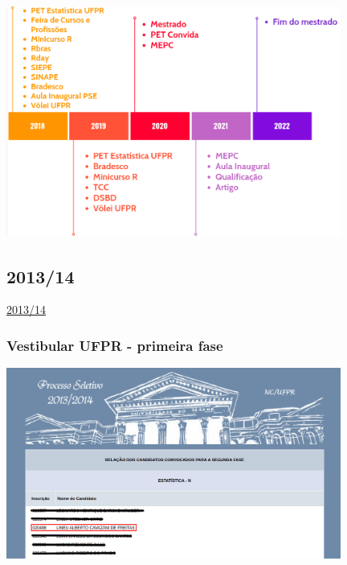 \documentclass[10pt,
  aspectratio=169,
  serif,
  mathserif,
  professionalfont,
  compress,
  handout,
  ]{beamer}\usepackage[]{graphicx}\usepackage[]{color}
\begin{document}

\begin{frame}

\begin{center}
  \includegraphics[width=10.98cm]{img/timeline12.png}
\end{center}

\end{frame}


\subsection{2013/14}

\begin{frame}[c, allowframebreaks]

\begin{center}

  {\huge \href{https://lineu96.github.io/st/}{2013/14}}
  
\end{center}

\end{frame}


\begin{frame}

\frametitle{Vestibular UFPR - primeira fase}

\begin{center}
  \includegraphics[width=11cm]{img/fase1.png}
\end{center}

\end{frame}
\end{document}
